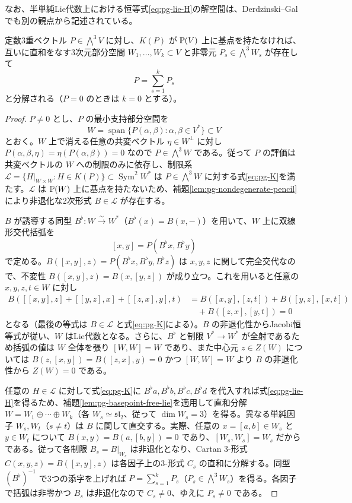 なお、半単純Lie代数上における恒等式\eqref{eq:pg-lie-H}の解空間は、Derdzinski--Gal \cite[(1.4), Theorem~B]{PDerdzinskiGal} でも別の観点から記述されている。

\begin{lemma}\label{lem:pg-quadratic-lie}
定数3重ベクトル $P\in\bigwedge^3V$ に対し、$K(P)$ が $\mathbb P(V)$ 上に基点を持たなければ、互いに直和をなす3次元部分空間 $W_1,\ldots,W_k\subset V$ と非零元 $P_s\in\bigwedge^3W_s$ が存在して
\[
  P=\sum_{s=1}^k P_s
\]
と分解される（$P=0$ のときは $k=0$ とする）。
\end{lemma}
\begin{proof}
$P\ne0$ とし、$P$ の最小支持部分空間を
\[
  W=\operatorname{span}\{P(\alpha,\beta):\alpha,\beta\in V^*\}\subset V
\]
とおく。$W$ 上で消える任意の共変ベクトル $\eta\in W^\perp$ に対し $P(\alpha,\beta,\eta)=\eta(P(\alpha,\beta))=0$ なので $P\in\bigwedge^3W$ である。従って $P$ の評価は共変ベクトルの $W$ への制限のみに依存し、制限系 $\mathcal L=\{H|_{W\times W}:H\in K(P)\}\subset\operatorname{Sym}^2W^*$ は $P\in\bigwedge^3W$ に対する式\eqref{eq:pg-K}を満たす。$\mathcal L$ は $\mathbb P(W)$ 上に基点を持たないため、補題\ref{lem:pg-nondegenerate-pencil}により非退化な2次形式 $B\in\mathcal L$ が存在する。

$B$ が誘導する同型 $B^\flat:W\xrightarrow{\sim}W^*$（$B^\flat(x)=B(x,-)$）を用いて、$W$ 上に双線形交代括弧を
\begin{equation}\label{eq:pg-support-bracket}
[x,y]=P(B^\flat x,B^\flat y)
\end{equation}
で定める。$B([x,y],z)=P(B^\flat x,B^\flat y,B^\flat z)$ は $x,y,z$ に関して完全交代なので、不変性 $B([x,y],z)=B(x,[y,z])$ が成り立つ。これを用いると任意の $x,y,z,t\in W$ に対し
\begin{equation}\label{eq:pg-support-jacobi}
\begin{aligned}
B([[x,y],z]+[[y,z],x]+[[z,x],y],t)
&=B([x,y],[z,t])+B([y,z],[x,t])\\
&\quad+B([z,x],[y,t])=0
\end{aligned}
\end{equation}
となる（最後の等式は $B\in\mathcal L$ と式\eqref{eq:pg-K}による）。$B$ の非退化性からJacobi恒等式が従い、$W$ はLie代数となる。さらに、$B^\flat$ と制限 $V^*\to W^*$ が全射であるため括弧の値は $W$ 全体を張り $[W,W]=W$ であり、また中心元 $z\in Z(W)$ については $B(z,[x,y])=B([z,x],y)=0$ かつ $[W,W]=W$ より $B$ の非退化性から $Z(W)=0$ である。

任意の $H\in\mathcal L$ に対して式\eqref{eq:pg-K}に $B^\flat a,B^\flat b,B^\flat c,B^\flat d$ を代入すれば式\eqref{eq:pg-lie-H}を得るため、補題\ref{lem:pg-basepoint-free-lie}を適用して直和分解 $W=W_1\oplus\cdots\oplus W_k$（各 $W_s\simeq\mathfrak{sl}_2$、従って $\dim W_s=3$）を得る。異なる単純因子 $W_s,W_t$（$s\ne t$）は $B$ に関して直交する。実際、任意の $x=[a,b]\in W_s$ と $y\in W_t$ について $B(x,y)=B(a,[b,y])=0$ であり、$[W_s,W_s]=W_s$ だからである。従って各制限 $B_s=B|_{W_s}$ は非退化となり、Cartan 3-形式 $C(x,y,z)=B([x,y],z)$ は各因子上の3-形式 $C_s$ の直和に分解する。同型 $(B^\flat)^{-1}$ で3つの添字を上げれば $P=\sum_{s=1}^k P_s$（$P_s\in\bigwedge^3W_s$）を得る。各因子で括弧は非零かつ $B_s$ は非退化なので $C_s\ne0$、ゆえに $P_s\ne0$ である。
\end{proof}

